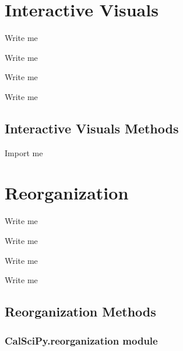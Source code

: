 \documentclass[letterpaper,10pt,english]{sphinxmanual}
\begin{document}
\section{Interactive Visuals}
\label{\detokenize{Sub-Packages:interactive-visuals}}\label{\detokenize{Sub-Packages:interactive-visuals-module}}
\begin{DUlineblock}{0em}
\item[] Write me
\item[] Write me
\item[] Write me
\item[] Write me
\end{DUlineblock}


\subsection{Interactive Visuals Methods}
\label{\detokenize{Sub-Packages:interactive-visuals-methods}}
\begin{DUlineblock}{0em}
\item[] Import me
\end{DUlineblock}


\section{Reorganization}
\label{\detokenize{Sub-Packages:reorganization}}\label{\detokenize{Sub-Packages:reorganization-module}}
\begin{DUlineblock}{0em}
\item[] Write me
\item[] Write me
\item[] Write me
\item[] Write me
\end{DUlineblock}


\subsection{Reorganization Methods}
\label{\detokenize{Sub-Packages:reorganization-methods}}
\sphinxstepscope


\subsubsection{CalSciPy.reorganization module}
\label{\detokenize{CalSciPy.reorganization:module-CalSciPy.reorganization}}\label{\detokenize{CalSciPy.reorganization:calscipy-reorganization-module}}\label{\detokenize{CalSciPy.reorganization::doc}}
\end{document}
